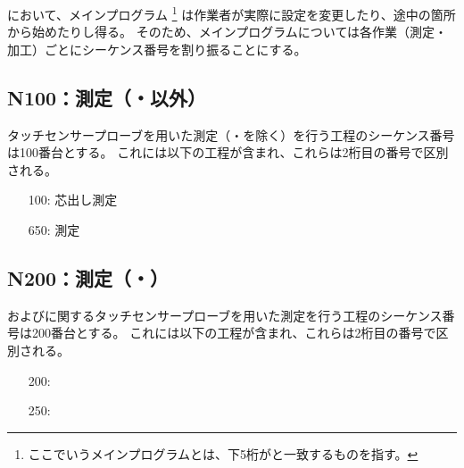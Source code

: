 \clearpage
\DMC において、メインプログラム
\footnote{ここでいうメインプログラムとは、下5桁が\DrawingNumber と一致するものを指す。}
は作業者が実際に設定を変更したり、途中の箇所から始めたりし得る。
そのため、メインプログラムについては各作業（測定・加工）ごとにシーケンス番号を割り振ることにする。


\subsection{N100：測定（\Dimple・\ReliefGroove 以外）}
タッチセンサープローブを用いた測定（\Dimple ・\ReliefGroove を除く）を行う工程のシーケンス番号は100番台とする。
これには以下の工程が含まれ、これらは2桁目の番号で区別される。
\begin{enumerate}
\item[100:] 芯出し測定
\item[650:] \nameCenterlineEndFaceDif 測定
\end{enumerate}


\subsection{N200：測定（\Dimple・\ReliefGroove）}
\Dimple および\ReliefGroove に関するタッチセンサープローブを用いた測定を行う工程のシーケンス番号は200番台とする。
これには以下の工程が含まれ、これらは2桁目の番号で区別される。
\begin{enumerate}
\item[200:] \DimpleMeasurement
\item[250:] \ReliefGrooveMeasurement
\end{enumerate}


